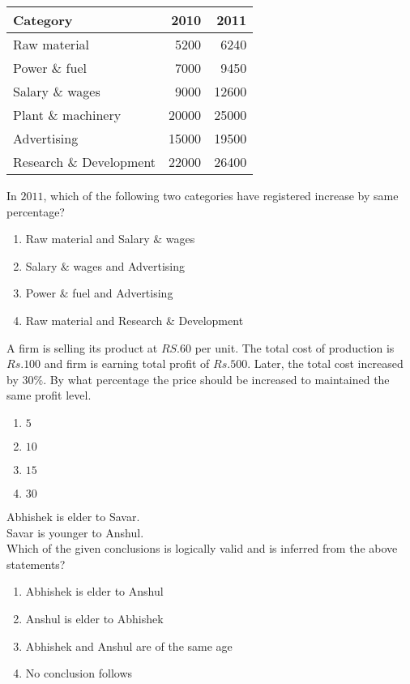     \begin{center}
    \begin{tabular}{|l|r|r|}
        \hline
        \textbf{Category} & \textbf{2010 } & \textbf{2011 } \\
        \hline
        Raw material & 5200 & 6240 \\
        Power \& fuel & 7000 & 9450 \\
        Salary \& wages & 9000 & 12600 \\
        Plant \& machinery & 20000 & 25000 \\
        Advertising & 15000 & 19500 \\
        Research \& Development & 22000 & 26400 \\
        \hline
    \end{tabular}
\end{center}
In $2011$, which of the following two categories have registered increase by same percentage?
\begin{enumerate}
    \item Raw material and Salary $\&$ wages
    \item Salary $\&$ wages and Advertising
    \item Power $\&$ fuel and Advertising
    \item Raw material and Research $\&$ Development
\end{enumerate}
\item A firm is selling its product at $RS. 60$ per unit. The total cost of production is $Rs. 100$ and firm is earning total profit of $Rs. 500.$ Later, the total cost increased by $30\%$. By what percentage the price should be increased to maintained the same profit level.
\begin{multicols}{4}
    \begin{enumerate}
        \item $5$
        \item $10$
        \item $15$
        \item $30$
    \end{enumerate}
\end{multicols}
\item Abhishek is elder to Savar.\\
Savar is younger to Anshul.\\
Which of the given conclusions is logically valid and is inferred from the above statements?
\begin{enumerate}
    \item Abhishek is elder to Anshul
    \item  Anshul is elder to Abhishek
    \item Abhishek and Anshul are of the same age
    \item No conclusion follows
\end{enumerate}

